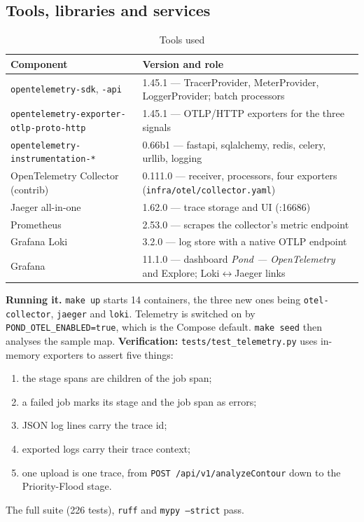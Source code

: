 \documentclass[manuscript,screen,review]{acmart}
\begin{document}
\subsection{Tools, libraries and services}
\begin{table}[h]
  \caption{Tools used}\label{tab:tools}
  \small
  \begin{tabularx}{\linewidth}{@{}lL@{}}
    \toprule
    Component & Version and role \\
    \midrule
    \texttt{opentelemetry-sdk}, \texttt{-api} & 1.45.1 --- TracerProvider, MeterProvider, LoggerProvider; batch processors \\
    \texttt{opentelemetry-exporter-otlp-proto-http} & 1.45.1 --- OTLP/HTTP exporters for the three signals \\
    \texttt{opentelemetry-instrumentation-*} & 0.66b1 --- fastapi, sqlalchemy, redis, celery, urllib, logging \\
    OpenTelemetry Collector (contrib) & 0.111.0 --- receiver, processors, four exporters (\texttt{infra/otel/collector.yaml}) \\
    Jaeger all-in-one & 1.62.0 --- trace storage and UI (:16686) \\
    Prometheus & 2.53.0 --- scrapes the collector's metric endpoint \\
    Grafana Loki & 3.2.0 --- log store with a native OTLP endpoint \\
    Grafana & 11.1.0 --- dashboard \emph{Pond --- OpenTelemetry} and Explore; Loki$\leftrightarrow$Jaeger links \\
    \bottomrule
  \end{tabularx}
\end{table}

\textbf{Running it.} \texttt{make up} starts 14 containers, the three new ones being
\texttt{otel-collector}, \texttt{jaeger} and \texttt{loki}. Telemetry is switched on by
\texttt{POND\_OTEL\_ENABLED=true}, which is the Compose default. \texttt{make seed} then
analyses the sample map. \textbf{Verification:} \texttt{tests/test\_telemetry.py} uses
in-memory exporters to assert five things:
\begin{enumerate}
  \item the stage spans are children of the job span;
  \item a failed job marks its stage and the job span as errors;
  \item JSON log lines carry the trace id;
  \item exported logs carry their trace context;
  \item one upload is one trace, from \texttt{POST /api/v1/analyzeContour} down to the
    Priority-Flood stage.
\end{enumerate}
The full suite (226 tests), \texttt{ruff} and \texttt{mypy --strict} pass.
\end{document}
